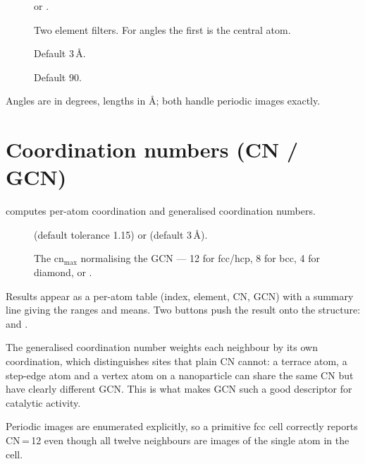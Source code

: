 \begin{description}
  \item[]  or
    .
  \item[] Two element filters. For
    angles the first is the central atom.
  \item[] Default 3\,\AA.
  \item[] Default 90.
\end{description}

Angles are in degrees, lengths in \AA{}; both handle periodic images
exactly.

\section{Coordination numbers (CN / GCN)}
\label{sec:coordination}

\menusep{} computes
per-atom coordination and generalised coordination numbers.

\begin{description}
  \item[] 
    (default tolerance 1.15) or  (default 3\,\AA).
  \item[] The $\mathrm{cn_{max}}$ normalising the GCN
    --- 12 for fcc/hcp, 8 for bcc, 4 for diamond, or
    .
\end{description}

Results appear as a per-atom table (index, element, CN, GCN) with a summary
line giving the ranges and means. Two buttons push the result onto the
structure:  and .

\begin{calnote}
The generalised coordination number weights each neighbour by its own
coordination, which distinguishes sites that plain CN cannot: a terrace
atom, a step-edge atom and a vertex atom on a nanoparticle can share the
same CN but have clearly different GCN. This is what makes GCN such a good
descriptor for catalytic activity.

Periodic images are enumerated explicitly, so a primitive fcc cell
correctly reports CN\,=\,12 even though all twelve neighbours are images of
the single atom in the cell.
\end{calnote}

